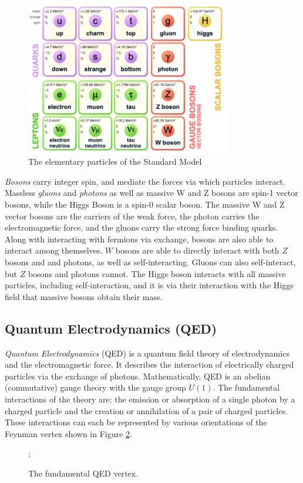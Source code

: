 \begin{figure}[h]
    \centering
    \includegraphics[width=0.8\textwidth]{Figures/1/sm.png}
    \caption{The elementary particles of the Standard Model}
    \label{fig:standardmodel}
\end{figure}

\textit{Bosons} carry integer spin, and mediate the forces via which particles interact. Massless \textit{gluons} and \textit{photons} as well as massive W and Z bosons are spin-1 vector bosons, while the Higgs Boson is a spin-0 scalar boson. The massive W and Z vector bosons are the carriers of the weak force, the photon carries the electromagnetic force, and the gluons carry the strong force binding quarks. Along with interacting with fermions via exchange, bosons are also able to interact among themselves. $W$ bosons are able to directly interact with both $Z$ bosons and and photons, as well as self-interacting. Gluons can also self-interact, but $Z$ bosons and photons cannot. The Higgs boson interacts with all massive particles, including self-interaction, and it is via their interaction with the Higgs field that massive bosons obtain their mass.

\subsection{Quantum Electrodynamics (QED)}
\textit{Quantum Electrodynamics} (QED) \cite{Feynman, schwartz, peskin} is a quantum field theory of electrodynamics and the electromagnetic force. It describes the interaction of electrically charged particles via the exchange of photons. Mathematically, QED is an abelian (commutative) gauge theory with the gauge group $U(1)$. The fundamental interactions of the theory are: the emission or absorption of a single photon by a charged particle and the creation or annihilation of a pair of charged particles. These interactions can each be represented by various orientations of the Feynman vertex shown in Figure \ref{fig:QEDvertex}.
\begin{figure}[h!]
    \centering
    ;
    \caption{The fundamental QED vertex.}
    \label{fig:QEDvertex}
\end{figure}


